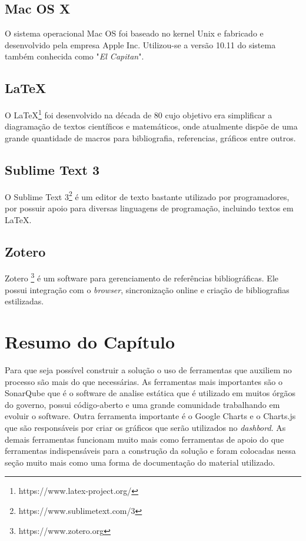 	\subsection{Mac OS X} %
	\label{sub:Mac OS X}
		O sistema operacional Mac OS foi baseado no kernel Unix e fabricado e desenvolvido pela empresa Apple Inc. Utilizou-se a versão 10.11 do sistema também conhecida como "\textit{El Capitan}".

	\subsection{LaTeX} %
	\label{sub:latex}
	
	O LaTeX\footnote{https://www.latex-project.org/} foi desenvolvido na década de 80 cujo objetivo era simplificar a diagramação de textos científicos e matemáticos, onde atualmente dispõe de uma grande quantidade de macros para bibliografia, referencias, gráficos entre outros.

	\subsection{Sublime Text 3} %
	\label{sub:sublime_text_3}
		O Sublime Text 3\footnote{https://www.sublimetext.com/3} é um editor de texto bastante utilizado por programadores, por possuir apoio para diversas linguagens de programação, incluindo textos em LaTeX.

	\subsection{Zotero} %
	\label{sub:zotero}
		Zotero \footnote{https://www.zotero.org} é um software para gerenciamento de referências bibliográficas. Ele possui integração com o \textit{browser}, sincronização online e criação de bibliografias estilizadas.
		
		
		
\section{Resumo do Capítulo}
Para que seja possível construir a solução o uso de ferramentas que auxiliem no processo são mais do que necessárias. As ferramentas mais importantes são o SonarQube que é o software de analise estática que é utilizado em muitos órgãos do governo, possui código-aberto e uma grande comunidade trabalhando em evoluir o software. Outra ferramenta importante é o Google Charts e o Charts.js que são responsáveis por criar os gráficos que serão utilizados no \textit{dashbord}. As demais ferramentas funcionam muito mais como ferramentas de apoio do que ferramentas indispensáveis para a construção da solução e foram colocadas nessa seção muito mais como uma forma de documentação do material utilizado.